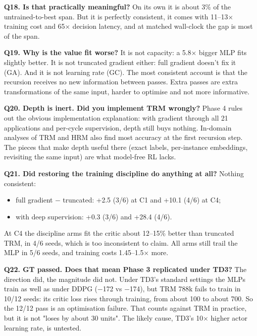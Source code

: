 \documentclass[11pt]{article}
\begin{document}
\textbf{Q18. Is that practically meaningful?} On its own it is about 3\% of the untrained-to-best span. But it is perfectly consistent, it comes with 11--13$\times$ training cost and 65$\times$ decision latency, and at matched wall-clock the gap is most of the span.



\textbf{Q19. Why is the value fit worse?} It is not capacity: a 5.8$\times$ bigger MLP fits slightly better. It is not truncated gradient either: full gradient doesn't fix it (GA). And it is not learning rate (GC). The most consistent account is that the recursion receives no new information between passes. Extra passes are extra transformations of the same input, harder to optimise and not more informative.



\textbf{Q20. Depth is inert. Did you implement TRM wrongly?} Phase 4 rules out the obvious implementation explanation: with gradient through all 21 applications and per-cycle supervision, depth still buys nothing. In-domain analyses of TRM and HRM also find most accuracy at the first recursion step. The pieces that make depth useful there (exact labels, per-instance embeddings, revisiting the same input) are what model-free RL lacks.



\textbf{Q21. Did restoring the training discipline do anything at all?} Nothing consistent:

\begin{itemize}
\item full gradient $-$ truncated: +2.5 (3/6) at C1 and +10.1 (4/6) at C4;
\item with deep supervision: +0.3 (3/6) and +28.4 (4/6).
\end{itemize}



At C4 the discipline arms fit the critic about 12--15\% better than truncated TRM, in 4/6 seeds, which is too inconsistent to claim. All arms still trail the MLP in 5/6 seeds, and training costs 1.45--1.5$\times$ more.



\textbf{Q22. GT passed. Does that mean Phase 3 replicated under TD3?} The direction did, the magnitude did not. Under TD3's standard settings the MLPs train as well as under DDPG ($-$172 vs $-$174), but TRM 788k fails to train in 10/12 seeds: its critic loss rises through training, from about 100 to about 700. So the 12/12 pass is an optimisation failure. That counts against TRM in practice, but it is not "loses by about 30 units". The likely cause, TD3's 10$\times$ higher actor learning rate, is untested.
\end{document}
